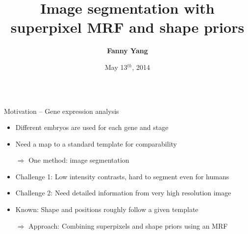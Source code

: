 \documentclass[mathserif,final,hyperref={pdfpagelabels=false}]{beamer} %
\title{\huge Image segmentation with superpixel MRF and shape priors}
\author{\bfseries Fanny Yang}
\institute{Department for Electrical Engineering and Computer Science, UC Berkeley}
\date{May 13$^{th}$, 2014}
\begin{document}
\begin{frame}
\begin{columns} 
\begin{column1lti}


\begin{blocklti}{Motivation -- Gene expression analysis}

\begin{itemize}
\item Different embryos are used for each gene and stage
\item Need a map to a standard template for comparability
\item[$\Rightarrow$] One method: image segmentation
\item Challenge 1: Low intensity contrasts, hard to segment even for humans
\item Challenge 2: Need detailed information from very high resolution image
\item Known: Shape and positions roughly follow a given template
\item[$\Rightarrow$] Approach: Combining superpixels and shape priors using an MRF
\end{itemize}


\end{blocklti}
\end{column1lti}
\end{columns}
\end{frame}
\end{document}
